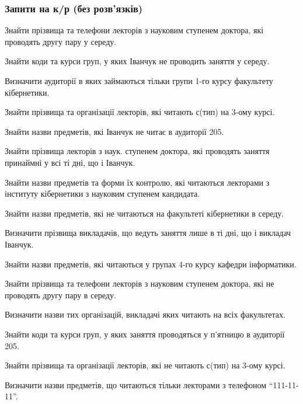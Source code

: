 \subsubsection{Запити на к/р (без розв'язків)}

\begin{card}
    \item Знайти прізвища та телефони лекторів з науковим ступенем доктора, які проводять другу пару у середу. 
    \item Знайти коди та курси груп, у яких Іванчук не проводить заняття у середу.
    \item Визначити аудиторії в яких займаються тільки групи 1-го курсу факультету кібернетики.
\end{card}

\begin{card}
    \item Знайти прізвища та організації лекторів, які читають с (тип) на 3-ому курсі.
    \item Знайти назви предметів, які Іванчук не читає в аудиторії 205.
    \item Знайти прізвища лекторів з наук. ступенем доктора, які проводять заняття принаймні у всі ті дні, що і Іванчук. 
\end{card}

\begin{card}
    \item Знайти назви предметів та форми їх контролю, які читаються лекторами з інституту кібернетики з науковим ступенем кандидата.
    \item Знайти назви предметів, які не читаються на факультеті кібернетики в середу.
    \item Визначити прізвища викладачів, що ведуть заняття лише в ті дні, що і викладач Іванчук. 
\end{card}

\begin{card}
    \item Знайти назви предметів, які читаються у групах 4-го курсу кафедри інформатики.
    \item Знайти прізвища та телефони лекторів з науковим ступенем доктора, які не проводять другу пару в середу.
    \item Визначити назви тих організацій, викладачі яких читають на всіх факультетах. 
\end{card}

\begin{card}
    \item Знайти коди та курси груп, у яких заняття проводяться у п'ятницю в аудиторії 205.
    \item Знайти прізвища та організації лекторів, які не читають с (тип) на 3-ому курсі.
    \item Визначити назви предметів, що читаються тільки лекторами з телефоном ``111-11-11''.
\end{card}

